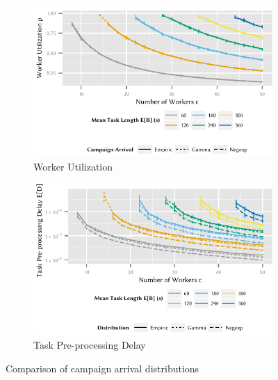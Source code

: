 \begin{figure}
	\centering
	\begin{subfigure}{\columnwidth}
		\includegraphics{cloud/crowdsourcing/measurements/figures/distribution_utilization}
		\caption{Worker Utilization}
		\label{fig:cloud:crowdsourcing:measurements:comparison:distribution:utilization}
	\end{subfigure}

	\begin{subfigure}{\columnwidth}
		\includegraphics{cloud/crowdsourcing/measurements/figures/distribution_task_delay}
		\caption{Task Pre-processing Delay}
		\label{fig:cloud:crowdsourcing:measurements:comparison:distribution:task_delay}
	\end{subfigure}
	\caption{Comparison of campaign arrival distributions}
	\label{fig:cloud:crowdsourcing:measurements:comparison:distribution}
\end{figure}

